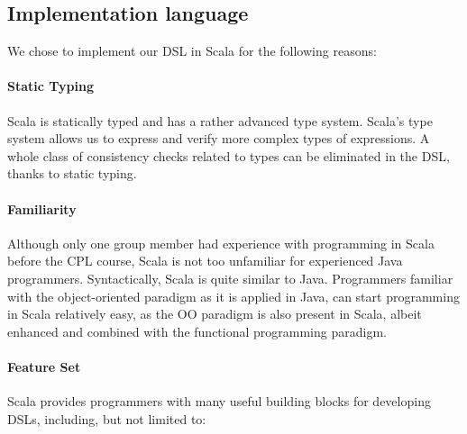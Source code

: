 \documentclass[a4paper]{article}
\begin{document}

\subsection{Implementation language}
\label{sec:implementation-language}

We chose to implement our DSL in Scala for the following reasons:

\paragraph{Static Typing}
Scala is statically typed and has a rather advanced type system.
Scala's type system allows us to express and verify more complex types of expressions.
A whole class of consistency checks related to types can be eliminated in the DSL, thanks to static typing.

\paragraph{Familiarity}
Although only one group member had experience with programming in Scala before the \textsc{CPL} course, Scala is not too unfamiliar for experienced Java programmers.
Syntactically, Scala is quite similar to Java.
Programmers familiar with the object-oriented paradigm as it is applied in Java, can start programming in Scala relatively easy, as the \textsc{OO} paradigm is also present in Scala, albeit enhanced and combined with the functional programming paradigm.

\paragraph{Feature Set}
Scala provides programmers with many useful building blocks for developing DSLs, including, but not limited to:
\end{document}
